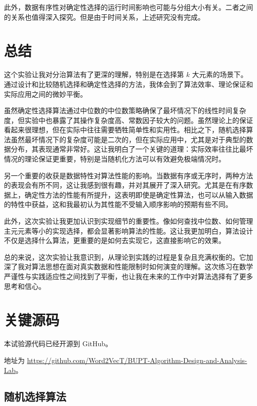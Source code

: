 此外，数据有序性对确定性选择的运行时间影响也可能与分组大小有关。二者之间的关系也值得深入探究。但是由于时间关系，上述研究没有完成。

\section{总结}

这个实验让我对分治算法有了更深的理解，特别是在选择第 $k$ 大元素的场景下。通过设计和比较随机选择和确定性选择的方法，我体会到了算法效率、理论保证和实际应用之间的微妙平衡。

虽然确定性选择算法通过中位数的中位数策略确保了最坏情况下的线性时间复杂度，但实验中也暴露了其操作复杂度高、常数因子较大的问题。虽然理论上的保证看起来很理想，但在实际中往往需要牺牲简单性和实用性。相比之下，随机选择算法虽然最坏情况下的复杂度可能是二次的，但在实际应用中，尤其是对于典型的数据分布，其表现通常非常好。这让我明白了一个关键的道理：实际效率往往比最坏情况的理论保证更重要，特别是当随机化方法可以有效避免极端情况时。

另一个重要的收获是数据特性对算法性能的影响。当数据有序或无序时，两种方法的表现会有所不同，这让我感到很有趣，并对其展开了深入研究。尤其是在有序数据上，确定性方法的性能有所提升，这表明即使是确定性算法，也可以从输入数据的特性中获益，这和我最初认为其性能不受输入顺序影响的预期有些不同。

此外，这次实验让我更加认识到实现细节的重要性。像如何查找中位数、如何管理主元元素等小的实现选择，都会显著影响算法的性能。这让我更加明白，算法设计不仅是选择什么算法，更重要的是如何去实现它，这直接影响它的效果。

总的来说，这次实验让我意识到，从理论到实践的过程是复杂且充满权衡的。它加深了我对算法思想在面对真实数据和性能限制时如何演变的理解。这次练习在数学严谨性与实践适应性之间找到了平衡，也让我在未来的工作中对算法选择有了更多思考和信心。

\appendix

\section{关键源码}

本试验源代码已经开源到 GitHub。

地址为 \url{https://github.com/Word2VecT/BUPT-Algorithm-Design-and-Analysis-Lab}。

\subsection{随机选择算法}

